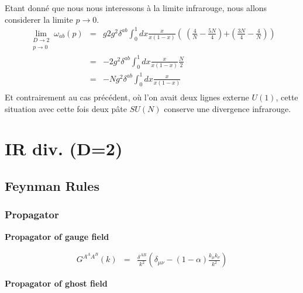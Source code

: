 \documentclass[a4paper,11pt]{article} %
\theoremstyle{plain}
\theoremstyle{definition}
\theoremstyle{remark}
\numberwithin{equation}{section}
\numberwithin{equation}{subsection}
\numberwithin{figure}{section}
\begin{document}
Etant donné que nous nous interessons à la limite infrarouge, nous allons considerer la limite $p \to 0$.
 \begin{eqnarray*}
 \lim\limits_{
\begin{array}{l}
D \to 2\\
p \to 0
\end{array}}  \omega_{ab}(p) &=& g2 g^{2}  \delta^{ab}
\int_{0}^{1}  dx \frac{x}{x(1-x)}
\left( \
\left( \frac{4}{N}  -  \frac{5N}{4}  \right)  \right. 
 \left.   + \left( \frac{3N}{4}  - \frac{4}{N}   \right) 
 \right)  \\
                                                     &=&  - 2 g^{2}  \delta^{ab}
\int_{0}^{1}  dx \frac{x}{x(1-x)}
\frac{N}{2} \\
                                                     &=&  - N g^{2}  \delta^{ab}
\int_{0}^{1}  dx \frac{x}{x(1-x)} \\
 \end{eqnarray*}
Et contrairement au cas précédent, où l'on avait deux lignes externe $U(1)$, cette situation avec cette fois deux pâte $SU(N)$ 
conserve une divergence infrarouge.



\section{IR div. (D=2)}

  \subsection{Feynman Rules}

    \subsubsection{Propagator}

\textbf{Propagator of gauge field}


\begin{eqnarray*}
 G^{ A^{A} A^{B} } (k)  &=&  
 \frac{ \delta^{AB} }{ k^2 } 
 \left(  \delta_{\mu \nu}  - (1-\alpha)  \frac{ k_{\mu} k_{\nu} }{ k^2 } \right) 
\end{eqnarray*}

\textbf{Propagator of ghost field}

\end{document}
